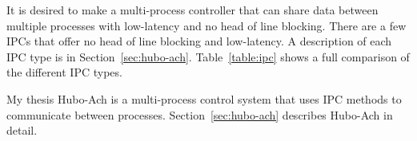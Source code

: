 It is desired to make a multi-process controller that can share data between multiple processes with low-latency and no head of line blocking.
There are a few IPCs that offer no head of line blocking and low-latency.  
A description of each IPC type is in Section~\ref{sec:hubo-ach}.
Table~\ref{table:ipc} shows a full comparison of the different IPC types.

My thesis Hubo-Ach is a multi-process control system that uses IPC methods to communicate between processes.
Section~\ref{sec:hubo-ach} describes Hubo-Ach in detail.


